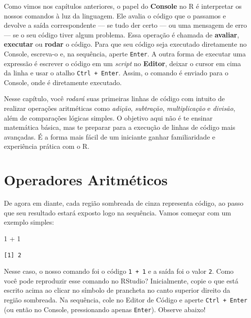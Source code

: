 \documentclass[
  letterpaper,
  DIV=11,
  numbers=noendperiod]{scrreprt}
\newenvironment{Shaded}{\begin{snugshade}}{\end{snugshade}}
\newcommand{\DecValTok}[1]{\textcolor[rgb]{0.68,0.00,0.00}{#1}}
\newcommand{\SpecialCharTok}[1]{\textcolor[rgb]{0.37,0.37,0.37}{#1}}
\begin{document}
Como vimos nos capítulos anteriores, o papel do \textbf{Console} no R é
interpretar os nossos comandos à luz da linguagem. Ele avalia o código
que o passamos e devolve a saída correspondente --- se tudo der certo
--- ou uma mensagem de erro --- se o seu código tiver algum problema.
Essa operação é chamada de \textbf{avaliar}, \textbf{executar} ou
\textbf{rodar} o código. Para que seu código seja executado diretamente
no Console, escreva-o e, na sequência, aperte \texttt{Enter}. A outra
forma de executar uma expressão é escrever o código em um \emph{script}
no \textbf{Editor}, deixar o cursor em cima da linha e usar o atalho
\texttt{Ctrl\ +\ Enter}. Assim, o comando é enviado para o Console, onde
é diretamente executado.

Nesse capítulo, você \emph{rodará} suas primeiras linhas de código com
intuito de realizar operações aritméticas como \emph{adição},
\emph{subtração}, \emph{multiplicação} e \emph{divisão}, além de
comparações lógicas simples. O objetivo aqui não é te ensinar matemática
básica, mas te preparar para a execução de linhas de código mais
avançadas. É a forma mais fácil de um iniciante ganhar familiaridade e
experiência prática com o R.

\section{Operadores Aritméticos}\label{operadores-aritmuxe9ticos}

De agora em diante, cada região sombreada de cinza representa código, ao
passo que seu resultado estará exposto logo na sequência. Vamos começar
com um exemplo simples:

\begin{Shaded}
\begin{Highlighting}[]
\DecValTok{1} \SpecialCharTok{+} \DecValTok{1}
\end{Highlighting}
\end{Shaded}

\begin{verbatim}
[1] 2
\end{verbatim}

Nesse caso, o nosso comando foi o código \texttt{1\ +\ 1} e a saída foi
o valor \texttt{2}. Como você pode reproduzir esse comando no RStudio?
Inicialmente, copie o que está escrito acima ao clicar no símbolo de
prancheta no canto superior direito da região sombreada. Na sequência,
cole no Editor de Código e aperte \texttt{Ctrl\ +\ Enter} (ou então no
Console, pressionando apenas \texttt{Enter}). Observe abaixo!
\end{document}
